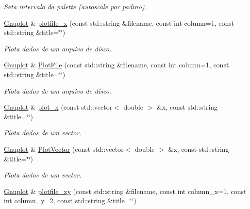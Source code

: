 \begin{DoxyCompactItemize}
\begin{DoxyCompactList}\small\item\em Seta intervalo da palette (autoscale por padrao). \end{DoxyCompactList}\item 
\hypertarget{classGnuplot_a4ca35415fa5560764597cfdfa46c6c40}{\hyperlink{classGnuplot}{Gnuplot} \& \hyperlink{classGnuplot_a4ca35415fa5560764597cfdfa46c6c40}{plotfile\-\_\-x} (const std\-::string \&filename, const int column=1, const std\-::string \&title=\char`\"{}\char`\"{})}\label{classGnuplot_a4ca35415fa5560764597cfdfa46c6c40}

\begin{DoxyCompactList}\small\item\em Plota dados de um arquivo de disco. \end{DoxyCompactList}\item 
\hypertarget{classGnuplot_a12ba90a46e80421f655049cb1d1d835d}{\hyperlink{classGnuplot}{Gnuplot} \& \hyperlink{classGnuplot_a12ba90a46e80421f655049cb1d1d835d}{Plot\-File} (const std\-::string \&filename, const int column=1, const std\-::string \&title=\char`\"{}\char`\"{})}\label{classGnuplot_a12ba90a46e80421f655049cb1d1d835d}

\begin{DoxyCompactList}\small\item\em Plota dados de um arquivo de disco. \end{DoxyCompactList}\item 
\hypertarget{classGnuplot_a9400d43204b9df62851c063aee604f0d}{\hyperlink{classGnuplot}{Gnuplot} \& \hyperlink{classGnuplot_a9400d43204b9df62851c063aee604f0d}{plot\-\_\-x} (const std\-::vector$<$ double $>$ \&x, const std\-::string \&title=\char`\"{}\char`\"{})}\label{classGnuplot_a9400d43204b9df62851c063aee604f0d}

\begin{DoxyCompactList}\small\item\em Plota dados de um vector. \end{DoxyCompactList}\item 
\hypertarget{classGnuplot_ab478d91039848a22733fc7a0f7c25f04}{\hyperlink{classGnuplot}{Gnuplot} \& \hyperlink{classGnuplot_ab478d91039848a22733fc7a0f7c25f04}{Plot\-Vector} (const std\-::vector$<$ double $>$ \&x, const std\-::string \&title=\char`\"{}\char`\"{})}\label{classGnuplot_ab478d91039848a22733fc7a0f7c25f04}

\begin{DoxyCompactList}\small\item\em Plota dados de um vector. \end{DoxyCompactList}\item 
\hypertarget{classGnuplot_af226f395310d3c5c4f8b4d2aaf5d8823}{\hyperlink{classGnuplot}{Gnuplot} \& \hyperlink{classGnuplot_af226f395310d3c5c4f8b4d2aaf5d8823}{plotfile\-\_\-xy} (const std\-::string \&filename, const int column\-\_\-x=1, const int column\-\_\-y=2, const std\-::string \&title=\char`\"{}\char`\"{})}\label{classGnuplot_af226f395310d3c5c4f8b4d2aaf5d8823}


\end{DoxyCompactItemize}
